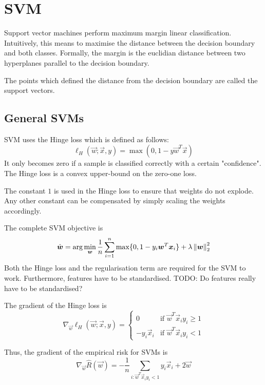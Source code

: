 \section{SVM}
Support vector machines perform maximum margin linear classification.
Intuitively, this means to maximise the distance between the decision
boundary and both classes.
Formally, the margin is the euclidian distance
between two hyperplanes parallel to the decision boundary.

The points which defined the distance from the decision
boundary are called the support vectors.


\subsection{General SVMs}

SVM uses the Hinge loss which is defined as follows:
\begin{equation*}
    \ell_H(\vec{w}; \vec{x}, y) =
    \max(0, 1 - y \vec{w}^T \vec{x})
\end{equation*}
It only becomes zero if a sample is classified correctly
with a certain "confidence".
The Hinge loss is a convex upper-bound on the
zero-one loss.

The constant $1$ is used in the Hinge loss to ensure
that weights do not explode.
Any other constant can be compensated by simply
scaling the weights accordingly.

The complete SVM objective is
\begin{equation*}
    \hat{\boldsymbol{w}} = \arg\min_{\boldsymbol{w}} \frac{1}{n}
    \sum_{i=1}^n \max\{0, 1 - y_i \boldsymbol{w}^T \boldsymbol{x}_i\}
    + \lambda \left\lVert\boldsymbol{w}\right\rVert_2^2
\end{equation*}
Both the Hinge loss and the regularisation term are required for
the SVM to work.
Furthermore, features have to be standardised.
TODO: Do features really have to be standardised?

The gradient of the Hinge loss is
\begin{equation*}
    \nabla_{\vec{w}} \ell_H(\vec{w}; \vec{x}, y) =
    \begin{cases}
        0 & \text{if $\vec{w}^T \vec{x}_i y_i \geq 1$} \\
        -y_i \vec{x}_i & \text{if $\vec{w}^T \vec{x}_i y_i < 1$}
    \end{cases}
\end{equation*}

Thus, the gradient of the empirical risk for SVMs is
\begin{equation*}
    \nabla_{\vec{w}} \hat{R}(\vec{w})
    = - \frac{1}{n} \sum_{i : \vec{w}^T \vec{x}_i y_i < 1}{
        y_i \vec{x}_i
    }
    + 2 \vec{w}
\end{equation*}

